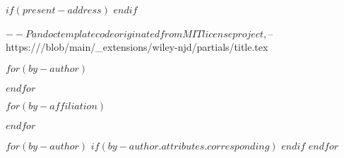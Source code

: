 
$if(present-address)$
$endif$


$-- Pandoc template code originated from MIT license project,
$-- https:///blob/main/_extensions/wiley-njd/partials/title.tex

$for(by-author)$
  \author[$for(by-author.affiliations)$$it.number$$sep$,$endfor$]{$by-author.name.literal$}
$endfor$

$for(by-affiliation)$
\address[$it.number$]{%
}
$endfor$

$for(by-author)$
  $if(by-author.attributes.corresponding)$
  $endif$
$endfor$
